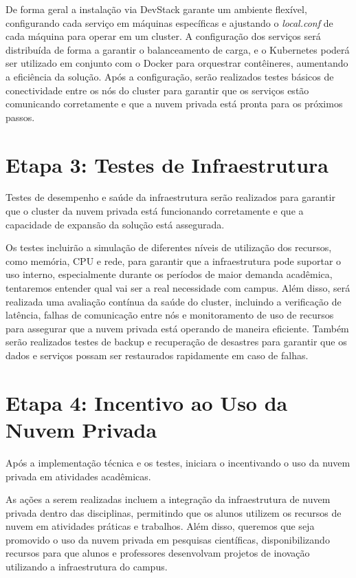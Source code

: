 De forma geral a instalação via DevStack garante um ambiente flexível, configurando cada serviço em máquinas específicas e ajustando o \textit{local.conf} de cada máquina para operar em um cluster. A configuração dos serviços será distribuída de forma a garantir o balanceamento de carga, e o Kubernetes poderá ser utilizado em conjunto com o Docker para orquestrar contêineres, aumentando a eficiência da solução. Após a configuração, serão realizados testes básicos de conectividade entre os nós do cluster para garantir que os serviços estão comunicando corretamente e que a nuvem privada está pronta para os próximos passos.

\section{Etapa 3: Testes de Infraestrutura}

Testes de desempenho e saúde da infraestrutura serão realizados para garantir que o cluster da nuvem privada está funcionando corretamente e que a capacidade de expansão da solução está assegurada.

Os testes incluirão a simulação de diferentes níveis de utilização dos recursos, como memória, CPU e rede, para garantir que a infraestrutura pode suportar o uso interno, especialmente durante os períodos de maior demanda acadêmica, tentaremos entender qual vai ser a real necessidade com campus. Além disso, será realizada uma avaliação contínua da saúde do cluster, incluindo a verificação de latência, falhas de comunicação entre nós e monitoramento de uso de recursos para assegurar que a nuvem privada está operando de maneira eficiente. Também serão realizados testes de backup e recuperação de desastres para garantir que os dados e serviços possam ser restaurados rapidamente em caso de falhas.

\section{Etapa 4: Incentivo ao Uso da Nuvem Privada}

Após a implementação técnica e os testes, iniciara o incentivando o uso da nuvem privada em atividades acadêmicas.

As ações a serem realizadas incluem a integração da infraestrutura de nuvem privada dentro das disciplinas, permitindo que os alunos utilizem os recursos de nuvem em atividades práticas e trabalhos. Além disso, queremos que seja promovido o uso da nuvem privada em pesquisas científicas, disponibilizando recursos para que alunos e professores desenvolvam projetos de inovação utilizando a infraestrutura do campus.


